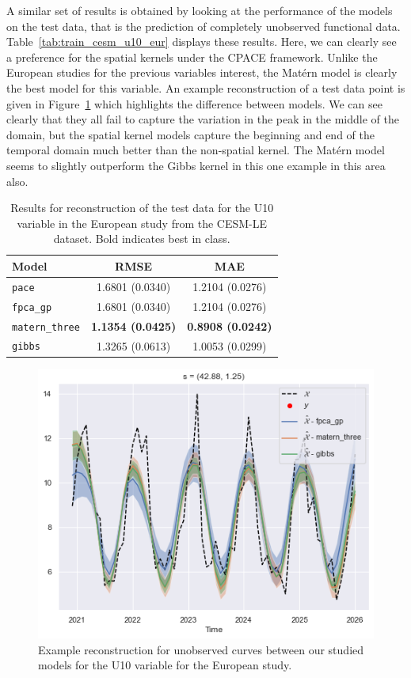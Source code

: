 A similar set of results is obtained by looking at the performance of the models on the test data, that is the prediction of completely unobserved functional data.
Table~\ref{tab:train_cesm_u10_eur} displays these results.
Here, we can clearly see a preference for the spatial kernels under the CPACE framework.
Unlike the European studies for the previous variables interest, the Mat\'ern model is clearly the best model for this variable.
An example reconstruction of a test data point is given in Figure~\ref{fig:test_ex_u10_eur} which highlights the difference between models. 
We can see clearly that they all fail to capture the variation in the peak in the middle of the domain, but the spatial kernel models capture the beginning and end of the temporal domain much better than the non-spatial kernel. 
The Mat\'ern model seems to slightly outperform the Gibbs kernel in this one example in this area also. 

\begin{table}
	\caption[Results for U10 variable on test data in the European study]{Results for reconstruction of the test data for the U10 variable in the European study from the CESM-LE dataset. Bold indicates best in class.}
	\centering
	\label{tab:test_cesm_u10_eur}
	\begin{tabular}{lcc}
		\toprule
		\textbf{Model} & \textbf{RMSE} & \textbf{MAE} \\
		\midrule
		\verb*|pace| & 1.6801 (0.0340) & 1.2104	(0.0276) \\
		\verb*|fpca_gp| & 1.6801 (0.0340) & 1.2104 (0.0276) \\
		\verb*|matern_three| & \textbf{1.1354 (0.0425)} & \textbf{0.8908 (0.0242)}\\
		\verb*|gibbs| & 1.3265 (0.0613) & 1.0053 (0.0299)\\
		\bottomrule
	\end{tabular}
\end{table}

\begin{figure}
	\centering
	\includegraphics[width=\textwidth]{test_ex_u10_eur}
	\caption{Example reconstruction for unobserved curves between our studied models for the U10 variable for the European study.}
	\label{fig:test_ex_u10_eur}
\end{figure}

